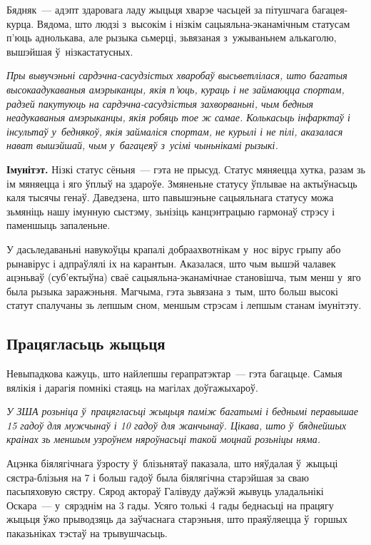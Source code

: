 Бядняк~--- адэпт здаровага ладу жыцьця хварэе часьцей за пітушчага багацея-курца. Вядома, што людзі з~высокім і нізкім сацыяльна-эканамічным статусам п'юць аднолькава, але рызыка сьмерці, зьвязаная з~ужываньнем алькаголю, вышэйшая ў~нізкастатусных.

\emph{Пры вывучэньні сардэчна-сасудзістых хваробаў высьветлілася, што багатыя высокаадукаваныя амэрыканцы, якія п'юць, кураць і не займаюцца спортам, радзей пакутуюць на сардэчна-сасудзістыя захворваньні, чым бедныя неадукаваныя амэрыканцы, якія робяць тое ж самае. Колькасьць інфарктаў і інсультаў у~беднякоў, якія займаліся спортам, не курылі і не пілі, аказалася нават вышэйшай, чым у~багацеяў з~усімі чыньнікамі рызыкі.}

\textbf{Імунітэт.} Нізкі статус сёньня~--- гэта не прысуд. Статус мяняецца хутка, разам зь ім мяняецца і яго ўплыў на здароўе. Змяненьне статусу ўплывае на актыўнасьць каля тысячы генаў. Даведзена, што павышэньне сацыяльнага статусу можа зьмяніць нашу імунную сыстэму, зьнізіць канцэнтрацыю гармонаў стрэсу і паменшыць запаленьне.


У дасьледаваньні навукоўцы крапалі добраахвотнікам у~нос вірус грыпу або рынавірус і адпраўлялі іх на карантын. Аказалася, што чым вышэй чалавек ацэньваў (суб'ектыўна) сваё сацыяльна-эканамічнае становішча, тым менш у~яго была рызыка заражэньня. Магчыма, гэта зьвязана з~тым, што больш высокі статут спалучаны зь лепшым сном, меншым стрэсам і лепшым станам імунітэту.

\subsection*{Працягласьць жыцьця}

Невыпадкова кажуць, што найлепшы герапратэктар~--- гэта багацьце. Самыя вялікія і дарагія помнікі стаяць на магілах доўгажыхароў.

\emph{У ЗША розьніца ў~працягласьці жыцьця паміж багатымі і беднымі перавышае 15 гадоў для мужчынаў і 10 гадоў для жанчынаў. Цікава, што ў~бяднейшых краінах зь меншым узроўнем няроўнасьці такой моцнай розьніцы няма.}

Ацэнка біялягічнага ўзросту ў~блізьнятаў паказала, што няўдалая ў~жыцьці сястра-блізьня на 7 і больш гадоў была біялягічна старэйшая за сваю пасьпяховую сястру. Сярод актораў Галівуду даўжэй жывуць уладальнікі Оскара~--- у~сярэднім на 3 гады. Усяго толькі 4 гады беднасьці на працягу жыцьця ўжо прыводзяць да заўчаснага старэньня, што праяўляецца ў~горшых паказьніках тэстаў на трывушчасьць.

